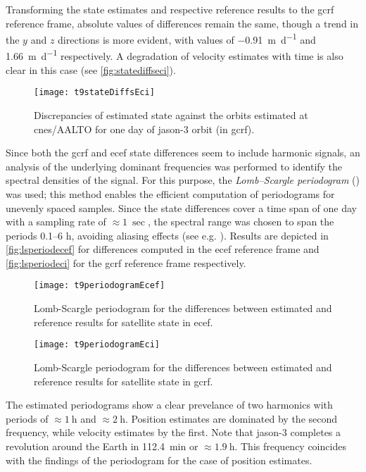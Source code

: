Transforming the state estimates and respective reference results to the \gls{gcrf} 
reference frame, absolute values of differences remain the same, though a trend in 
the $y$ and $z$ directions is more evident, with values of \SI{-0.91}{\metre\per\day} 
and \SI{+1.66}{\metre\per\day} respectively. A degradation of velocity estimates with 
time is also clear in this case (see \autoref{fig:statediffseci}).

\begin{figure}[h]
    \centering
    \texttt{[image: t9stateDiffsEci]}
    \caption{Discrepancies of estimated state against the orbits estimated at \gls{cnes}/AALTO for one day of \gls{jason}-3 orbit (in \gls{gcrf}).}
    \label{fig:statediffseci}
\end{figure}

Since both the \gls{gcrf} and \gls{ecef} state differences seem to include 
harmonic signals, an analysis of the underlying dominant frequencies was performed to 
identify the spectral densities of the signal. For this purpose, the 
\emph{Lomb–Scargle periodogram} (\cite{Scargle1982}) was used; this method enables 
the efficient computation of periodograms for unevenly spaced samples. Since the 
state differences cover a time span of one day with a sampling rate of $\approx \SI{1}{\sec}$, 
the spectral range was chosen to span the periods \numrange{0.1}{6} \si{\hour}, 
avoiding aliasing effects (see e.g. \cite{VanderPlas2018}). Results are depicted in 
\autoref{fig:lsperiodecef} for differences computed in the \gls{ecef} reference frame 
and \autoref{fig:lsperiodeci} for the \gls{gcrf} reference frame respectively.

\begin{figure}[h]
    \centering
    \texttt{[image: t9periodogramEcef]}
    \caption{Lomb-Scargle periodogram for the differences between estimated and reference results for satellite state in \gls{ecef}.}
    \label{fig:lsperiodecef}
\end{figure}

\begin{figure}[h]
    \centering
    \texttt{[image: t9periodogramEci]}
    \caption{Lomb-Scargle periodogram for the differences between estimated and reference results for satellite state in \gls{gcrf}.}
    \label{fig:lsperiodeci}
\end{figure}

The estimated periodograms show a clear prevelance of two harmonics with periods of 
$\approx \SI{1}{\hour}$ and $\approx \SI{2}{\hour}$. Position estimates are dominated by 
the second frequency, while velocity estimates by the first. Note that \gls{jason}-3 
completes a revolution around the Earth in \SI{112.4}{\minute} or $\approx \SI{1.9}{\hour}$. 
This frequency coincides with the findings of the periodogram for the case of position 
estimates.

